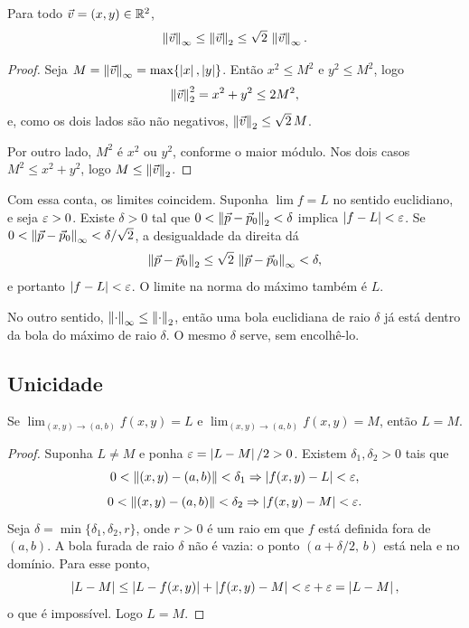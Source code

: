 \documentclass[11pt,a4paper]{article}
\begin{document}
\begin{teorema}
Para todo $\vec{v}=(x,y)\in\mathbb{R}^2$,
\[
\left\lVert \vec{v} \right\rVert_{\infty}\le\left\lVert \vec{v} \right\rVert_{2}\le\sqrt{2}\,\left\lVert \vec{v} \right\rVert_{\infty}.
\]
\end{teorema}

\begin{proof}
Seja $M=\left\lVert \vec{v} \right\rVert_{\infty}=\max\{\left\lvert x \right\rvert,\left\lvert y \right\rvert\}$. Então $x^2\le M^2$ e $y^2\le M^2$, logo
\[
\left\lVert \vec{v} \right\rVert_{2}^{2}=x^2+y^2\le 2M^2,
\]
e, como os dois lados são não negativos, $\left\lVert \vec{v} \right\rVert_{2}\le\sqrt{2}\,M$.

Por outro lado, $M^2$ é $x^2$ ou $y^2$, conforme o maior módulo. Nos dois casos $M^2\le x^2+y^2$, logo $M\le\left\lVert \vec{v} \right\rVert_{2}$.
\end{proof}

Com essa conta, os limites coincidem. Suponha $\lim f=L$ no sentido euclidiano, e seja $\varepsilon>0$. Existe $\delta>0$ tal que $0<\left\lVert \vec{p}-\vec{p}_0 \right\rVert_2<\delta$ implica $\left\lvert f-L \right\rvert<\varepsilon$. Se $0<\left\lVert \vec{p}-\vec{p}_0 \right\rVert_{\infty}<\delta/\sqrt{2}$, a desigualdade da direita dá
\[
\left\lVert \vec{p}-\vec{p}_0 \right\rVert_{2}\le\sqrt{2}\,\left\lVert \vec{p}-\vec{p}_0 \right\rVert_{\infty}<\delta,
\]
e portanto $\left\lvert f-L \right\rvert<\varepsilon$. O limite na norma do máximo também é $L$.

No outro sentido, $\left\lVert \cdot \right\rVert_{\infty}\le\left\lVert \cdot \right\rVert_{2}$, então uma bola euclidiana de raio $\delta$ já está dentro da bola do máximo de raio $\delta$. O mesmo $\delta$ serve, sem encolhê-lo.

\subsection{Unicidade}

\begin{teorema}
Se $\lim_{(x,y)\to(a,b)} f(x,y)=L$ e $\lim_{(x,y)\to(a,b)} f(x,y)=M$, então $L=M$.
\end{teorema}

\begin{proof}
Suponha $L\neq M$ e ponha $\varepsilon=\left\lvert L-M \right\rvert/2>0$. Existem $\delta_1,\delta_2>0$ tais que
\[
0<\left\lVert (x,y)-(a,b) \right\rVert<\delta_1\Rightarrow\left\lvert f(x,y)-L \right\rvert<\varepsilon,
\]
\[
0<\left\lVert (x,y)-(a,b) \right\rVert<\delta_2\Rightarrow\left\lvert f(x,y)-M \right\rvert<\varepsilon.
\]
Seja $\delta=\min\{\delta_1,\delta_2,r\}$, onde $r>0$ é um raio em que $f$ está definida fora de $(a,b)$. A bola furada de raio $\delta$ não é vazia: o ponto $(a+\delta/2,\,b)$ está nela e no domínio. Para esse ponto,
\[
\left\lvert L-M \right\rvert\le\left\lvert L-f(x,y) \right\rvert+\left\lvert f(x,y)-M \right\rvert<\varepsilon+\varepsilon=\left\lvert L-M \right\rvert,
\]
o que é impossível. Logo $L=M$.
\end{proof}
\end{document}
